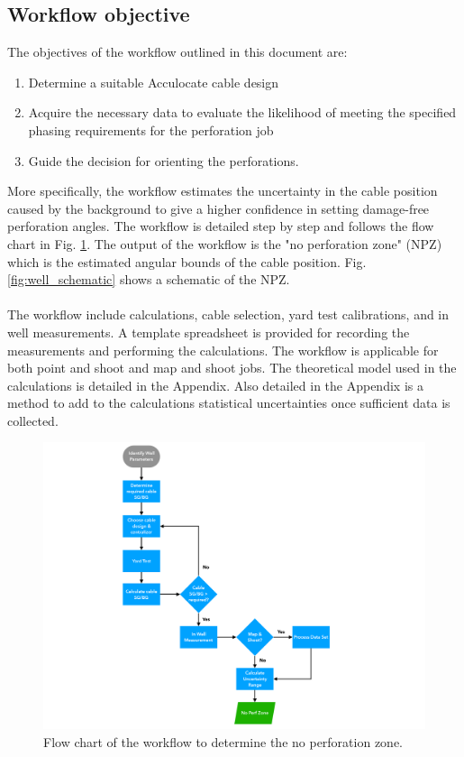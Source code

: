 \documentclass[paper=a4, fontsize=11pt]{scrartcl}
\numberwithin{equation}{section}		%
\numberwithin{figure}{section}			%
\numberwithin{table}{section}				%
\begin{document}
\subsection{Workflow objective}
The objectives of the workflow outlined in this document are:
\begin{enumerate}
    \item Determine a suitable Acculocate cable design
    \item Acquire the necessary data to evaluate the likelihood of meeting the specified phasing requirements for the perforation job
    \item Guide the decision for orienting the perforations.
\end{enumerate}
More specifically, the workflow estimates the uncertainty in the cable position caused by the background to give a higher confidence in setting damage-free perforation angles.  The workflow is detailed step by step and follows the flow chart in Fig. \ref{fig:flowchart}.  The output of the workflow is the "no perforation zone" (NPZ) which is the estimated angular bounds of the cable position.  Fig. \ref{fig:well_schematic} shows a schematic of the NPZ.

\paragraph{}
The workflow include calculations, cable selection, yard test calibrations, and in well measurements.  A template spreadsheet is provided for recording the measurements and performing the calculations.  The workflow is applicable for both point and shoot and map and shoot jobs. The theoretical model used in the calculations is detailed in the Appendix.  Also detailed in the Appendix is a method to add to the calculations statistical uncertainties once sufficient data is collected.

\begin{figure}[h!]
    \caption{Flow chart of the workflow to determine the no perforation zone.}
    \label{fig:flowchart}
    \centering
    \includegraphics[width=1.0\textwidth]{figures/flow_chart.pdf}
\end{figure}
\end{document}
